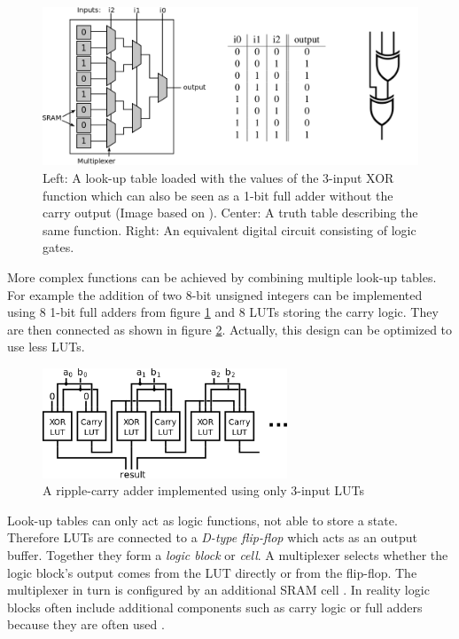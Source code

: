 \begin{figure}[htb]
	  \centerline{
		\includegraphics[width=1.0\textwidth]{images/LUT2.png}}
	  \caption{Left: A look-up table loaded with the values of the 3-input XOR function which can also be seen as a 1-bit full adder without the carry output (Image based on \cite{farooq}). 
	  Center: A truth table describing
the same function. 
	Right: An equivalent digital circuit consisting of logic gates.}
	  \label{fig:LUT}
\end{figure}

More complex functions can be achieved by combining multiple look-up tables.
For example the addition of two 8-bit unsigned integers can be implemented using 8 1-bit full adders from figure \ref{fig:LUT} and 8 LUTs storing the carry logic.
They are then connected as shown in figure \ref{fig:ripple}.
Actually, this design can be optimized to use less LUTs.


\begin{figure}[htb]
	  \centerline{
		\includegraphics[width=0.65\textwidth]{images/rippleadder.png}}
	  \caption{A ripple-carry adder implemented using only 3-input LUTs}
	  \label{fig:ripple}
\end{figure}


Look-up tables can only act as logic functions, not able to store a state.
Therefore LUTs are connected to a \emph{D-type flip-flop} which acts as an output buffer.
Together they form a \emph{logic block} or \emph{cell}.
A multiplexer selects whether the logic block's output comes from the LUT directly or from the flip-flop.
The multiplexer in turn is configured by an additional SRAM cell \cite{farooq}.
In reality logic blocks often include additional components such as carry logic or full adders because they are often used \cite{altera_arch}.

